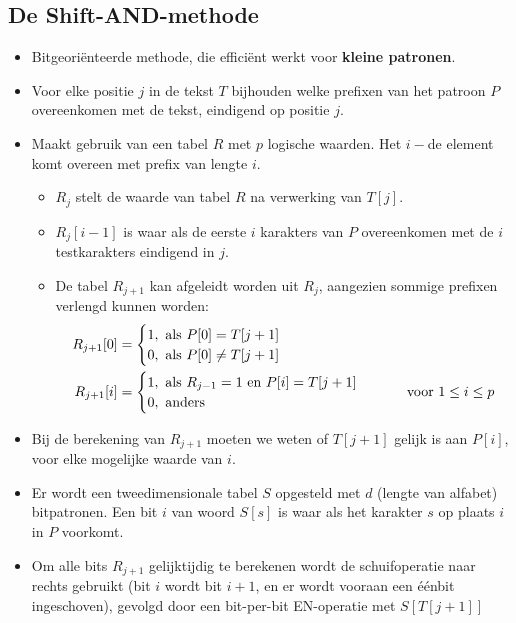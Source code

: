 \subsection{De Shift-AND-methode}
\begin{itemize}
    \item Bitgeoriënteerde methode, die efficiënt werkt voor \textbf{kleine patronen}.
    \item Voor elke positie $j$ in de tekst $T$ bijhouden welke prefixen van het patroon $P$ overeenkomen met de tekst, eindigend op positie $j$.
    \item Maakt gebruik van een tabel $R$ met $p$ logische waarden. Het $i-$de element komt overeen met prefix van lengte $i$.
    \begin{itemize}
        \item $R_j$ stelt de waarde van tabel $R$ na verwerking van $T[j]$.
        \item $R_j[i - 1]$ is waar als de eerste $i$ karakters van $P$ overeenkomen met de $i$ testkarakters eindigend in $j$.
        \item De tabel $R_{j+1}$ kan afgeleidt worden uit $R_j$, aangezien sommige prefixen verlengd kunnen worden:
        \begin{align*}
            R_{j + 1}[0] & = \begin{cases}
                1, \hbox{ als } P[0] = T[j + 1] \\
                0, \hbox{ als } P[0] \neq T[j + 1] \\
            \end{cases}\\
            R_{j + 1}[i] & = \begin{cases}
                1, \hbox{ als } R_{j - 1} = 1 \hbox{ en } P[i] = T[j + 1] \\
                0, \hbox{ anders }
            \end{cases} 
            \qquad \hbox{ voor } 1 \leq i \leq p
        \end{align*}
    \end{itemize}
    \item Bij de berekening van $R_{j + 1}$ moeten we weten of $T[j + 1]$ gelijk is aan $P[i]$, voor elke mogelijke waarde van $i$.
    \item Er wordt een tweedimensionale tabel $S$ opgesteld met $d$ (lengte van alfabet) bitpatronen. Een bit $i$ van woord $S[s]$ is waar als het karakter $s$ op plaats $i$ in $P$ voorkomt.

    \item Om alle bits $R_{j + 1}$ gelijktijdig te berekenen wordt de schuifoperatie naar rechts gebruikt (bit $i$ wordt bit $i + 1$, en er wordt vooraan een éénbit ingeschoven), gevolgd door een bit-per-bit EN-operatie met $S[T[j + 1]]$
    

\end{itemize}

